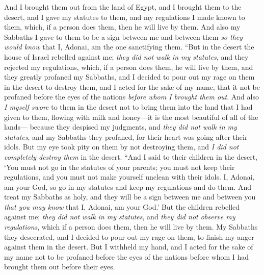 \begin{biblechapter}
\verse And I brought them out from the land of Egypt, and I brought them to the desert,
\verse and I gave my statutes to them, and my regulations I made known to them, which, if a person does them, then he will live by them.
\verse And also my Sabbaths I gave to them to be a sign between me and between them \textit{so they would know} that I, Adonai, am the one sanctifying them.
\verse “But in the desert the house of Israel rebelled against me; \textit{they did not walk in my statutes}, and they rejected my regulations, which, if a person does them, he will live by them, and they greatly profaned my Sabbaths, and I decided to pour out my rage on them in the desert to destroy them,
\verse and I acted for the sake of my name, that it not be profaned before the eyes of the nations \textit{before whom I brought them out}.
\verse And also \textit{I myself swore} to them in the desert not to bring them into the land that I had given to them, flowing with milk and honey—it is the most beautiful of all of the lands—
\verse because they despised my judgments, and \textit{they did not walk in my statutes}, and my Sabbaths they profaned, for their heart was going after their idols.
\verse But my eye took pity on them by not destroying them, and \textit{I did not completely destroy them} in the desert.
\verse “And I said to their children in the desert, ‘You must not go in the statutes of your parents; you must not keep their regulations, and you must not make yourself unclean with their idols.
\verse I, Adonai, am your God, so go in my statutes and keep my regulations and do them.
\verse And treat my Sabbaths as holy, and they will be a sign between me and between you \textit{that you may know} that I, Adonai, am your God.’
\verse But the children rebelled against me; \textit{they did not walk in my statutes}, and \textit{they did not observe my regulations}, which if a person does them, then he will live by them. My Sabbaths they desecrated, and I decided to pour out my rage on them, to finish my anger against them in the desert.
\verse But I withheld my hand, and I acted for the sake of my name not to be profaned before the eyes of the nations before whom I had brought them out before their eyes.

\end{biblechapter}
